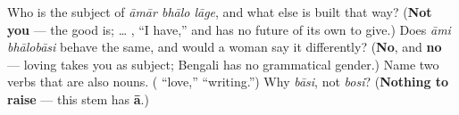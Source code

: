 \begin{tcolorbox}[breakable,colback=teal!4,colframe=teal!35!black,title={Before you move on}]
Who is the subject of \emph{āmār bhālo lāge}, and what else is built that way? (\textbf{Not you} — the good is;  … , \textquotedblleft{}I have,\textquotedblright{} and  has no future of its own to give.) Does \emph{āmi bhālobāsi} behave the same, and would a woman say it differently? (\textbf{No}, and \textbf{no} — loving takes you as subject; Bengali has no grammatical gender.) Name two verbs that are also nouns. (\textbf{} \textquotedblleft{}love,\textquotedblright{} \textbf{} \textquotedblleft{}writing.\textquotedblright{}) Why \emph{bāsi}, not \emph{bosi}? (\textbf{Nothing to raise} — this stem has \textbf{ā}.)
\end{tcolorbox}
